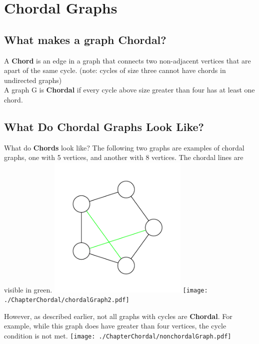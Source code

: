\chapter{Chordal Graphs}
\section{What makes a graph Chordal?}
A \textbf{Chord} is an edge in a graph that connects two non-adjacent vertices that are apart of the same cycle. (note: cycles of size three cannot have chords in undirected graphs)\\
A graph G is \textbf{Chordal} if every cycle above size greater than four has at least one chord.\\

\section{What Do Chordal Graphs Look Like?}
What do \textbf{Chords} look like? The following two graphs are examples of chordal graphs, one with 5 vertices, and another with 8 vertices. The chordal lines are visible in green.
\includegraphics[width=0.5\textwidth]{./ChapterChordal/chordalGraph.pdf}
\texttt{[image: ./ChapterChordal/chordalGraph2.pdf]}

However, as described earlier, not all graphs with cycles are \textbf{Chordal}. For example, while this graph does have greater than four vertices, the cycle condition is not met.
\texttt{[image: ./ChapterChordal/nonchordalGraph.pdf]}


